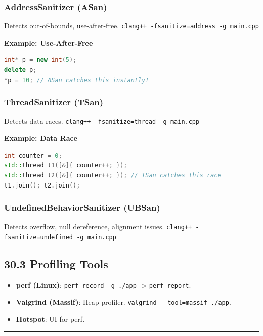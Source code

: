 \hypertarget{addresssanitizer-asan}{%
\subsubsection{AddressSanitizer (ASan)}\label{addresssanitizer-asan}}

Detects out-of-bounds, use-after-free.
\passthrough{\lstinline!clang++ -fsanitize=address -g main.cpp!}

\textbf{Example: Use-After-Free}

\begin{lstlisting}[language={C++}]
int* p = new int(5);
delete p;
*p = 10; // ASan catches this instantly!
\end{lstlisting}

\hypertarget{threadsanitizer-tsan}{%
\subsubsection{ThreadSanitizer (TSan)}\label{threadsanitizer-tsan}}

Detects data races.
\passthrough{\lstinline!clang++ -fsanitize=thread -g main.cpp!}

\textbf{Example: Data Race}

\begin{lstlisting}[language={C++}]
int counter = 0;
std::thread t1([&]{ counter++; });
std::thread t2([&]{ counter++; }); // TSan catches this race
t1.join(); t2.join();
\end{lstlisting}

\hypertarget{undefinedbehaviorsanitizer-ubsan}{%
\subsubsection{UndefinedBehaviorSanitizer
(UBSan)}\label{undefinedbehaviorsanitizer-ubsan}}

Detects overflow, null dereference, alignment issues.
\passthrough{\lstinline!clang++ -fsanitize=undefined -g main.cpp!}

\hypertarget{profiling-tools}{%
\subsection{30.3 Profiling Tools}\label{profiling-tools}}

\begin{itemize}
\tightlist
\item
  \textbf{perf (Linux)}: \passthrough{\lstinline!perf record -g ./app!}
  -\textgreater{} \passthrough{\lstinline!perf report!}.
\item
  \textbf{Valgrind (Massif)}: Heap profiler.
  \passthrough{\lstinline!valgrind --tool=massif ./app!}.
\item
  \textbf{Hotspot}: UI for perf.
\end{itemize}

\begin{center}\rule{0.5\linewidth}{0.5pt}\end{center}
